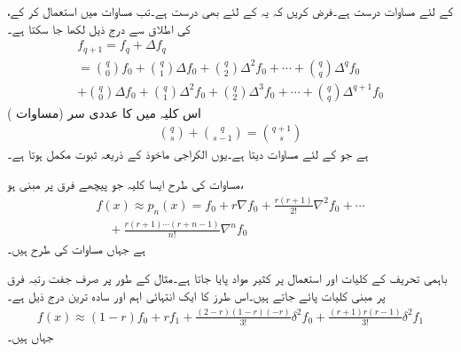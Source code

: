   کے لئے مساوات  درست ہے۔فرض کریں کہ یہ   کے لئے بھی درست ہے۔تب مساوات  میں  استعمال کر کے،  کی اطلاق سے درج ذیل لکھا جا سکتا ہے۔
\begin{multline*}
f_{q+1}=f_q+\Delta f_q\\
=\binom{q}{0}f_0+\binom{q}{1} \Delta f_0+\binom{q}{2}\Delta^2 f_0+\cdots +\binom{q}{q}\Delta^q f_0\\
+\binom{q}{0}\Delta f_0+\binom{q}{1}\Delta^2 f_0+\binom{q}{2}\Delta^3 f_0+\cdots +\binom{q}{q}\Delta^{q+1} f_0
\end{multline*}
اس کلیہ میں  کا عددی سر (مساوات )
\begin{align*}
\binom{q}{s}+\binom{q}{s-1}=\binom{q+1}{s}
\end{align*}
ہے جو  کے لئے مساوات  دیتا ہے۔یوں الکراجی ماخوذ کے ذریعہ ثبوت مکمل ہوتا ہے۔

مساوات  کی طرح ایسا کلیہ جو پیچھے فرق پر مبنی ہو،  
\begin{multline}\label{مساوات_اعدادی_نیوٹن_باہمی_تحریف_پیچھے}
f(x)\approx p_n(x)=f_0+r\nabla f_0+\frac{r(r+1)}{2!}\nabla^2 f_0+\cdots\\
\quad +\frac{r(r+1)\cdots (r+n-1)}{n!}\nabla ^n f_0
\end{multline}
ہے جہاں مساوات  کی طرح  ہیں۔

باہمی تحریف کے کلیات اور استعمال پر کثیر مواد پایا جاتا ہے۔مثال کے طور پر  صرف جفت رتبہ فرق پر مبنی کلیات پائے جاتے ہیں۔اس طرز کا ایک انتہائی اہم اور  سادہ ترین   درج ذیل ہے۔
\begin{align}\label{مساوات_اعدادی_کلیہ_ایورٹ}
f(x)\approx (1-r)f_0+rf_1+\frac{(2-r)(1-r)(-r)}{3!}\delta^2f_0+\frac{(r+1)r(r-1)}{3!}\delta^2f_1
\end{align}   
جہاں  ہیں۔

